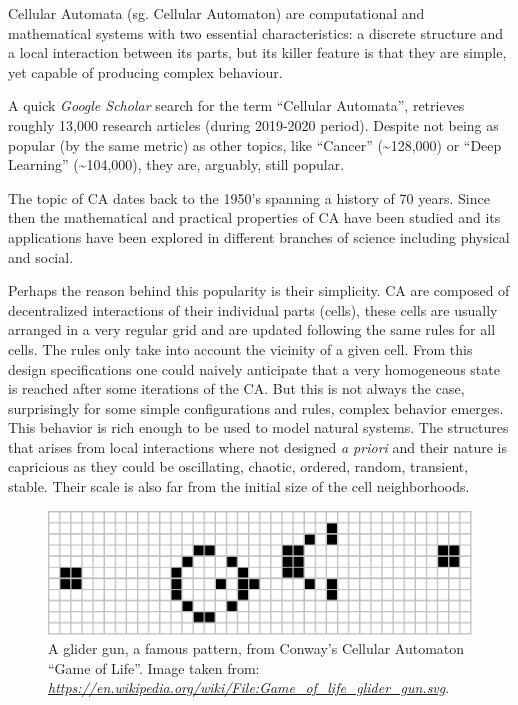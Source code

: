 \documentclass[
  openany]{book}
\begin{document}
Cellular Automata (sg. Cellular Automaton) are computational and mathematical systems with two essential characteristics: a discrete structure and a local interaction between its parts, but its killer feature is that they are simple, yet capable of producing complex behaviour.

A quick \emph{Google Scholar} search for the term ``Cellular Automata'', retrieves roughly 13,000 research articles (during 2019-2020 period). Despite not being as popular (by the same metric) as other topics, like ``Cancer'' (\textasciitilde128,000) or ``Deep Learning'' (\textasciitilde104,000), they are, arguably, still popular.

The topic of CA dates back to the 1950's spanning a history of 70 years. Since then the mathematical and practical properties of CA have been studied and its applications have been explored in different branches of science including physical and social.

Perhaps the reason behind this popularity is their simplicity. CA are composed of decentralized interactions of their individual parts (cells), these cells are usually arranged in a very regular grid and are updated following the same rules for all cells. The rules only take into account the vicinity of a given cell. From this design specifications one could naively anticipate that a very homogeneous state is reached after some iterations of the CA. But this is not always the case, surprisingly for some simple configurations and rules, complex behavior emerges. This behavior is rich enough to be used to model natural systems. The structures that arises from local interactions where not designed \emph{a priori} and their nature is capricious as they could be oscillating, chaotic, ordered, random, transient, stable. Their scale is also far from the initial size of the cell neighborhoods.



\begin{figure}

{\centering \includegraphics[width=0.8\linewidth]{pics/Game_of_life_glider_gun} 

}

\caption{A glider gun, a famous pattern, from Conway's Cellular Automaton ``Game of Life''. Image taken from: \emph{\url{https://en.wikipedia.org/wiki/File:Game_of_life_glider_gun.svg}}.}\label{fig:CA-example}
\end{figure}
\end{document}
